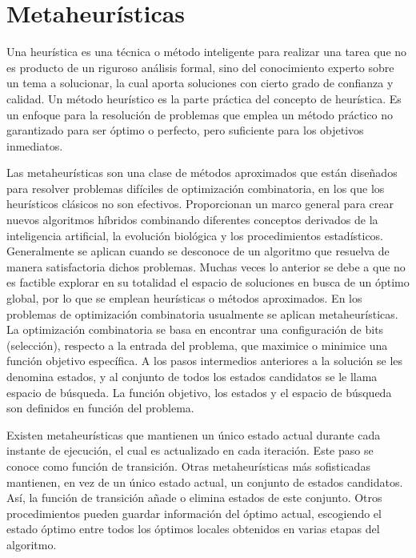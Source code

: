 \documentclass[a4paper,openright,11pt,oneside]{book}
\begin{document}
	\section{Metaheurísticas}
	
	Una heurística \cite{gonzalez2001evaluacion} es una técnica o método inteligente para realizar una tarea que no es producto de un riguroso análisis formal, sino del conocimiento experto sobre un tema a solucionar, la cual aporta soluciones con cierto grado de confianza y calidad. Un método heurístico es la parte práctica del concepto de heurística. Es un enfoque para la resolución de problemas que emplea un método práctico no garantizado para ser óptimo o perfecto, pero suficiente para los objetivos inmediatos.
	
	Las metaheurísticas \cite{yagiura2001metaheuristic} son una clase de métodos aproximados que están diseñados para resolver problemas difíciles de optimización combinatoria, en los que los heurísticos clásicos no son efectivos. Proporcionan un marco general para crear nuevos algoritmos híbridos combinando diferentes conceptos derivados de la inteligencia artificial, la evolución biológica y los procedimientos estadísticos. Generalmente se aplican cuando se desconoce de un algoritmo que resuelva de manera satisfactoria dichos problemas. Muchas veces lo anterior se debe a que no es factible explorar en su totalidad el espacio de soluciones en busca de un óptimo global, por lo que se emplean heurísticas o métodos aproximados. En los problemas de optimización combinatoria \cite{gandomi2013metaheuristic} usualmente se aplican metaheurísticas. \\
	
	La optimización combinatoria se basa en encontrar una configuración de bits (selección), respecto a la entrada del problema, que maximice o minimice una función objetivo específica. A los pasos intermedios anteriores a la solución se les denomina estados, y al conjunto de todos los estados candidatos se le llama espacio de búsqueda. La función objetivo, los estados y el espacio de búsqueda son definidos en función del problema.
	
	Existen metaheurísticas que mantienen un único estado actual durante cada instante de ejecución, el cual es actualizado en cada iteración. Este paso se conoce como función de transición. Otras metaheurísticas más sofisticadas mantienen, en vez de un único estado actual, un conjunto de estados candidatos. Así, la función de transición añade o elimina estados de este conjunto. Otros procedimientos pueden guardar información del óptimo actual, escogiendo el estado óptimo entre todos los óptimos locales obtenidos en varias etapas del algoritmo. \\
	
\end{document}
